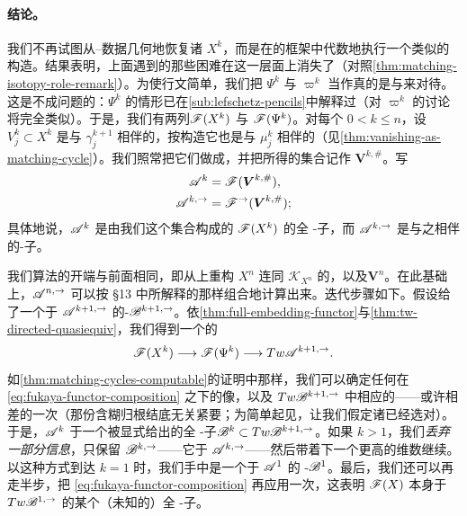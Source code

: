 \paragraph{结论。}\label{sub:conclusions}
我们不再试图从\trPicard--\trLefschetz{}数据几何地恢复诸 $X^k$，而是在\trFukayaCategory{}的框架中代数地执行一个类似的构造。结果表明，上面遇到的那些困难在这一层面上消失了（对照\cref{thm:matching-isotopy-role-remark}）。为使行文简单，我们把 $\Psi^k$ 与 $\varpi^k$ 当作真的是\trExact\trLefschetzFibration{}与\trBifibration{}来对待。这是不成问题的：$\Psi^k$ 的情形已在\cref{sub:lefschetz-pencils}中解释过（对 $\varpi^k$ 的讨论将完全类似）。于是，我们有两列\trFukayaCategory{}$\mathscr{F}(X^k)$ 与 $\mathscr{F}(\Psi^k)$。对每个 $0<k\le n$，设 $V^k_j\subset X^k$ 是与 $\gamma^{k+1}_j$ 相伴的\trVanishingCycle，按构造它也是与 $\mu^k_j$ 相伴的\trMatchingCycle（见\cref{thm:vanishing-as-matching-cycle}）。我们照常把它们做成\trLagrange\trBrane，并把所得的集合记作 $\boldsymbol{V}^{k,\#}$。写
\begin{equation*}
\begin{aligned}
\mathscr{A}^k&=\mathscr{F}(\boldsymbol{V}^{k,\#}),\\
\mathscr{A}^{k,\rightarrow}&=\mathscr{F}^{\rightarrow}(\boldsymbol{V}^{k,\#});
\end{aligned}
\end{equation*}
具体地说，$\mathscr{A}^k$ 是由我们这个\trVanishingCycle{}集合构成的 $\mathscr{F}(X^k)$ 的全 \trAinfty-子\trCategory，而 $\mathscr{A}^{k,\rightarrow}$ 是与之相伴的\trDirected{}\trAinfty-子\trCategory。

我们算法的开端与前面相同，即从\trTopology{}上重构 $X^n$ 连同 $\mathcal{K}_{X^n}$ 的\trTrivialization，以及\trVanishingCycle{}$\boldsymbol{V}^n$。在此基础上，$\mathscr{A}^{n,\rightarrow}$ 可以按 §13 中所解释的那样组合地计算出来。迭代步骤如下。假设给了一个\trQuasiisomorphic{}于 $\mathscr{A}^{k+1,\rightarrow}$ 的\trDirected{}\trAinfty-\trCategory{}$\mathscr{B}^{k+1,\rightarrow}$。依\cref{thm:full-embedding-functor}与\cref{thm:tw-directed-quasiequiv}，我们得到一个\trCohomology{}\trFullyFaithful{}的 \trAFunctor
\begin{equation}\label{eq:fukaya-functor-composition}
\mathscr{F}(X^k)\longrightarrow\mathscr{F}(\Psi^k)\longrightarrow Tw\mathscr{A}^{k+1,\rightarrow}.
\end{equation}
如\cref{thm:matching-cycles-computable}的证明中那样，我们可以确定任何\trMatchingCycle{}在 \eqref{eq:fukaya-functor-composition} 之下的像，以及 $Tw\mathscr{B}^{k+1,\rightarrow}$ 中相应的\trObject——或许相差\trGrading{}的一次\trSuspension（那份含糊归根结底无关紧要；为简单起见，让我们假定诸\trGrading{}已经选对）。于是，$\mathscr{A}^k$ \trQuasiisomorphic{}于一个被显式给出的全 \trAinfty-子\trCategory{}$\mathscr{B}^k\subset Tw\mathscr{B}^{k+1,\rightarrow}$。如果 $k>1$，我们\emph{丢弃一部分信息}，只保留 $\mathscr{B}^{k,\rightarrow}$——它\trQuasiisomorphic{}于 $\mathscr{A}^{k,\rightarrow}$——然后带着下一个更高的维数继续。以这种方式到达 $k=1$ 时，我们手中是一个\trQuasiisomorphic{}于 $\mathscr{A}^1$ 的 \trAinfty-\trCategory{}$\mathscr{B}^1$。最后，我们还可以再走半步，把 \eqref{eq:fukaya-functor-composition} 再应用一次，这表明 $\mathscr{F}(X)$ 本身\trQuasiequivalent{}于 $Tw\mathscr{B}^{1,\rightarrow}$ 的某个（\trApriori{}未知的）全 \trAinfty-子\trCategory。

